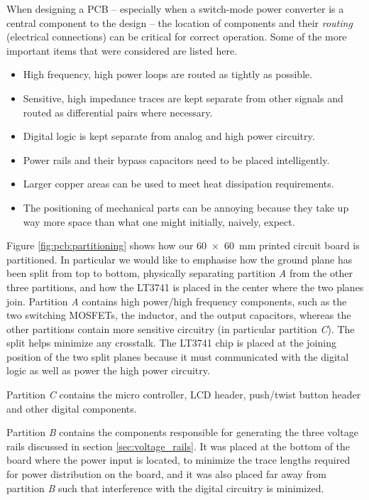 When designing a PCB --  especially  when  a  switch-mode  power  converter is a
central  component  to  the  design  --  the  location  of  components and their
\emph{routing} (electrical connections) can be  critical  for correct operation.
Some  of  the  more  important  items  that  were  considered  are  listed here.
\begin{itemize}
    \item
        High frequency, high power loops are routed as tightly as possible.
    \item
        Sensitive, high impedance traces are kept separate from other signals
        and routed as differential pairs where necessary.
    \item
        Digital logic is kept separate from analog and high power circuitry.
    \item
        Power rails and their bypass capacitors need to be placed intelligently.
    \item
        Larger copper areas can be used to meet heat dissipation requirements.
    \item
        The positioning of mechanical parts can be annoying because they take up
        way more space than what one might initially, naively, expect.
\end{itemize}

Figure \ref{fig:pcb:partitioning} shows how our \SI{60x60}{\milli\meter} printed
circuit board is partitioned.  In  particular we would like to emphasise how the
ground plane has been split from top to  bottom, physically separating partition
\emph{A} from the other three  partitions,  and  how the LT3741 is placed in the
center where the two planes join.  Partition  \emph{A}  contains high power/high
frequency components, such  as  the two switching MOSFETs, the inductor, and the
output capacitors, whereas the other partitions contain more sensitive circuitry
(in particular partition \emph{C}). The  split helps minimize any crosstalk. The
LT3741 chip is placed at the joining position of the two split planes because it
must communicated with  the  digital  logic  as  well  as  power  the high power
circuitry.

Partition \emph{C} contains the micro  controller, LCD header, push/twist button
header and other digital components.

Partition \emph{B} contains the components responsible for generating  the three
voltage rails discussed in section \ref{sec:voltage_rails}. It was placed at the
bottom  of  the  board  where  the power input is located, to minimize the trace
lengths required for power distribution on the board, and it was also placed far
away  from  partition \emph{B} such that interference with the digital circuitry
is minimized.

